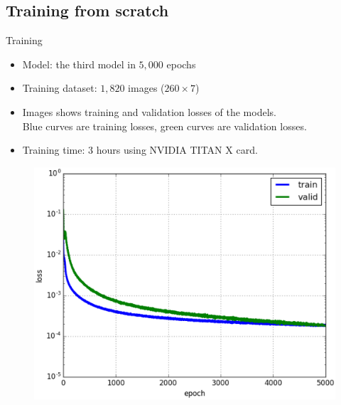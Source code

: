 \documentclass[10pt]{beamer}
\begin{document}
\subsection{Training from scratch}
\begin{frame}{Training}{}
	\begin{itemize}
		\item Model: the third model in $5,000$ epochs\footnotemark
		\item Training dataset: $1,820$ images ($260 \times 7$)
		\item Images shows training and validation losses of the models.\\ \small{{\color{blue}Blue} curves are training losses, {\color{green}green} curves are validation losses.}
		\item Training time: 3 hours using NVIDIA TITAN X card.
	\end{itemize}
	\begin{center}
     \begin{figure}[htbp]
        \centering
        \includegraphics[scale=.31]{images/loss_model_3}
    	\label{figrsexample1}
	\end{figure}
  \end{center}
	
\end{frame}

\end{document}
